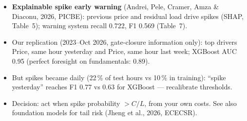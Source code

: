 \begin{itemize}\setlength{\itemsep}{2pt}
  \item \textbf{Explainable spike early warning} (Andrei, Pele, Cramer, Amza \& Diaconu, 2026, PICBE): previous price and residual load drive spikes (SHAP, Table~5); warning system recall 0.722, F1 0.569 (Table~7).
  \item Our replication (2023--Oct 2026, gate-closure information only): top drivers Price, same hour yesterday and Price, same hour last week; XGBoost AUC 0.95 (perfect foresight on fundamentals: 0.89).
  \item But spikes became daily (22\,\% of test hours vs 10\,\% in training): ``spike yesterday'' reaches F1 0.77 vs 0.63 for XGBoost --- recalibrate thresholds.
  \item Decision: act when spike probability $> C/L$, from your own costs. See also foundation models for tail risk (Jheng et al., 2026, ECECSR).
\end{itemize}
